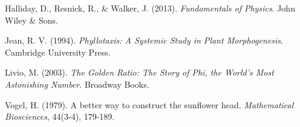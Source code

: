 \documentclass[12pt, a4paper]{article}
\begin{document}
\begin{thebibliography}{9}

Halliday, D., Resnick, R., \& Walker, J. (2013).
\textit{Fundamentals of Physics}.
John Wiley \& Sons.

Jean, R. V. (1994).
\textit{Phyllotaxis: A Systemic Study in Plant Morphogenesis}.
Cambridge University Press.

Livio, M. (2003).
\textit{The Golden Ratio: The Story of Phi, the World's Most Astonishing Number}.
Broadway Books.

Vogel, H. (1979).
A better way to construct the sunflower head.
\textit{Mathematical Biosciences}, 44(3-4), 179-189.

\end{thebibliography}
\end{document}
